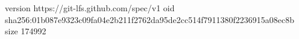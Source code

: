 version https://git-lfs.github.com/spec/v1
oid sha256:01b087e9323c09fa04e2b211f2762da95de2cc514f7911380f2236915a08ec8b
size 174992
